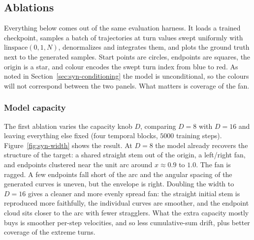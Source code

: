 \subsection{Ablations}
\label{sec:syn-ablations}

Everything below comes out of the same evaluation harness. It loads a trained
checkpoint, samples a batch of trajectories at turn values swept uniformly with
$\text{linspace}(0,1,N)$, denormalizes and integrates them, and plots the ground
truth next to the generated samples. Start points are circles, endpoints are
squares, the origin is a star, and colour encodes the swept turn index from blue
to red. As noted in Section~\ref{sec:syn-conditioning} the model is
unconditional, so the colours will not correspond between the two panels. What
matters is coverage of the fan.

\subsubsection{Model capacity}
\label{sec:syn-ablation-width}

The first ablation varies the capacity knob $D$, comparing $D=8$ with $D=16$ and
leaving everything else fixed (four temporal blocks, $5000$ training steps).
Figure~\ref{fig:syn-width} shows the result. At $D=8$ the model already recovers
the structure of the target: a shared straight stem out of the origin, a
left/right fan, and endpoints clustered near the unit arc around $x\approx0.9$ to
$1.0$. The fan is ragged. A few endpoints fall short of the arc and the angular
spacing of the generated curves is uneven, but the envelope is right. Doubling
the width to $D=16$ gives a cleaner and more evenly spread fan: the straight
initial stem is reproduced more faithfully, the individual curves are smoother,
and the endpoint cloud sits closer to the arc with fewer stragglers. What the
extra capacity mostly buys is smoother per-step velocities, and so less
cumulative-sum drift, plus better coverage of the extreme turns.

